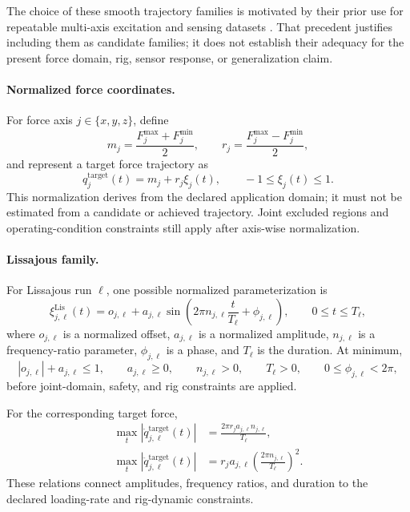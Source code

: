 \documentclass[11pt,a4paper]{article}
\begin{document}
The choice of these smooth trajectory families is motivated by their prior use
for repeatable multi-axis excitation and sensing datasets
\cite{zhang2022,ha2023}. That precedent justifies including them as candidate
families; it does not establish their adequacy for the present force domain,
rig, sensor response, or generalization claim.

\paragraph{Normalized force coordinates.}
For force axis $j\in\{x,y,z\}$, define
\begin{equation}
    m_j
    =
    \frac{
        F_j^{\max}+F_j^{\min}
    }{2},
    \qquad
    r_j
    =
    \frac{
        F_j^{\max}-F_j^{\min}
    }{2},
\end{equation}
and represent a target force trajectory as
\begin{equation}
    q_j^{\mathrm{target}}(t)
    =
    m_j+r_j\xi_j(t),
    \qquad
    -1\leq\xi_j(t)\leq1.
\end{equation}
This normalization derives from the declared application domain; it must not
be estimated from a candidate or achieved trajectory. Joint excluded regions
and operating-condition constraints still apply after axis-wise
normalization.

\paragraph{Lissajous family.}
For Lissajous run $\ell$, one possible normalized parameterization is
\begin{equation}
    \xi_{j,\ell}^{\mathrm{Lis}}(t)
    =
    o_{j,\ell}
    +
    a_{j,\ell}
    \sin
    \left(
        2\pi n_{j,\ell}\frac{t}{T_\ell}
        +
        \phi_{j,\ell}
    \right),
    \qquad
    0\leq t\leq T_\ell,
\end{equation}
where $o_{j,\ell}$ is a normalized offset, $a_{j,\ell}$ is a normalized
amplitude, $n_{j,\ell}$ is a frequency-ratio parameter,
$\phi_{j,\ell}$ is a phase, and $T_\ell$ is the duration. At minimum,
\begin{equation}
    \left|o_{j,\ell}\right|
    +
    a_{j,\ell}
    \leq 1,
    \qquad
    a_{j,\ell}\geq0,
    \qquad
    n_{j,\ell}>0,
    \qquad
    T_\ell>0,
    \qquad
    0\leq\phi_{j,\ell}<2\pi,
\end{equation}
before joint-domain, safety, and rig constraints are applied.

For the corresponding target force,
\begin{align}
    \max_t
    \left|
        \dot{q}_{j,\ell}^{\mathrm{target}}(t)
    \right|
    &=
    \frac{
        2\pi r_j a_{j,\ell}n_{j,\ell}
    }{
        T_\ell
    },\\
    \max_t
    \left|
        \ddot{q}_{j,\ell}^{\mathrm{target}}(t)
    \right|
    &=
    r_j a_{j,\ell}
    \left(
        \frac{
            2\pi n_{j,\ell}
        }{
            T_\ell
        }
    \right)^2.
\end{align}
These relations connect amplitudes, frequency ratios, and duration to the
declared loading-rate and rig-dynamic constraints.
\end{document}
